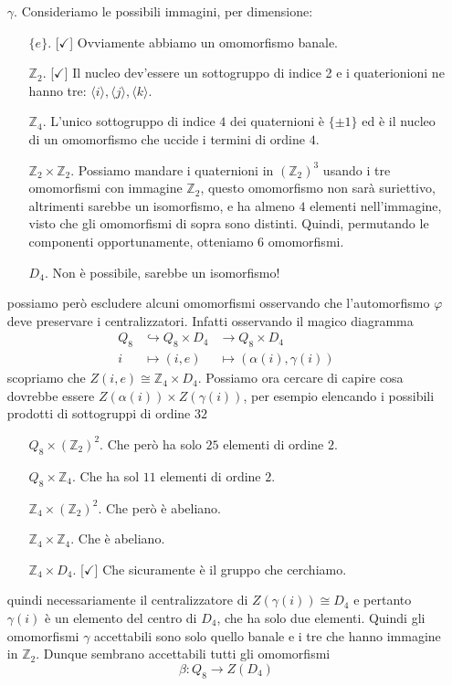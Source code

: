 \documentclass[a4paper]{article}
\theoremstyle{remark}
\theoremstyle{definition}
\begin{document}
\begin{multicols}{2}
\begin{itemize}
	 	\item [$ \gamma $.] Consideriamo le possibili immagini, per dimensione:
	 	\begin{itemize}
	 		\item [$\{e\}  $.][$ \checkmark $] Ovviamente abbiamo un omomorfismo banale.
	 		\item [$ \mathbb{Z}_2 $.][$ \checkmark $] Il nucleo dev'essere un sottogruppo di indice 2 e i quaterionioni ne hanno tre: $ \langle i \rangle, \langle j \rangle, \langle k \rangle $.
	 		\item [$ \mathbb{Z}_4 $.] L'unico sottogruppo di indice $ 4 $ dei quaternioni è $ \{\pm 1\} $ ed è il nucleo di un omomorfismo che uccide i termini di ordine $ 4 $.
	 		\item [$ \mathbb{Z}_2\times\mathbb{Z}_2 $.] Possiamo mandare i quaternioni in $ \left(\mathbb{Z}_2\right)^3 $ usando i tre omomorfismi con immagine $ \mathbb{Z}_2 $, questo omomorfismo non sarà suriettivo, altrimenti sarebbe un isomorfismo, e ha almeno $ 4 $ elementi nell'immagine, visto che gli omomorfismi di sopra sono distinti. Quindi, permutando le componenti opportunamente, otteniamo $ 6 $ omomorfismi.
	 		\item [$ D_4 $.] Non è possibile, sarebbe un isomorfismo!
	 	\end{itemize}
	 	possiamo però escludere alcuni omomorfismi osservando che l'automorfismo $ \varphi $ deve preservare i centralizzatori. Infatti osservando il magico diagramma
	 	\begin{align*}
	 		Q_8 &\hookrightarrow Q_8 \times D_4 &\rightarrow Q_8 \times D_4 \\
	 		i &\mapsto (i, e) &\mapsto (\alpha(i), \gamma(i))
	 	\end{align*}
		 scopriamo che $ Z(i, e) \cong \mathbb{Z}_4 \times D_4 $. Possiamo ora cercare di capire cosa dovrebbe essere $ Z(\alpha(i))\times Z(\gamma(i)) $, per esempio elencando i possibili prodotti di sottogruppi di ordine $ 32 $
		 \begin{itemize}
		 	\item [$ Q_8 \times \left(\mathbb{Z}_2\right)^2 $.]
		 	Che però ha solo $ 25 $ elementi di ordine $ 2 $.
		 	\item [$ Q_8 \times \mathbb{Z}_4 $.]
		 	Che ha sol $ 11 $ elementi di ordine $ 2 $.
		 	\item [$ \mathbb{Z}_4 \times \left(\mathbb{Z}_2\right)^2 $.] Che però è abeliano.
		 	\item [$ \mathbb{Z}_4 \times \mathbb{Z}_4 $.] Che è abeliano.
		 	\item [$ \mathbb{Z}_4 \times D_4$.][$ \checkmark $] Che sicuramente è il gruppo che cerchiamo.
		 \end{itemize}
	 quindi necessariamente il centralizzatore di $ Z(\gamma(i)) \cong D_4 $ e pertanto $ \gamma(i) $ è un elemento del centro di $ D_4 $, che ha solo due elementi. Quindi gli omomorfismi $ \gamma $ accettabili sono solo quello banale e i tre che hanno immagine in $ \mathbb{Z}_2 $. Dunque sembrano accettabili tutti gli omomorfismi
	 \[ \beta: Q_8 \to Z(D_4) \]
	 

\end{itemize}
\end{multicols}
\end{document}
